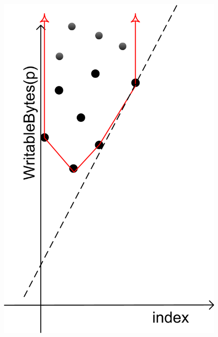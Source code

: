 \documentclass[10pt]{sigplanconf}
\begin{document}
\begin{figure}[t]
{    \includegraphics[scale=.57]{Polyhedra.png}
    \label{fig:polyhedra}
    }
\end{figure}
\end{document}
